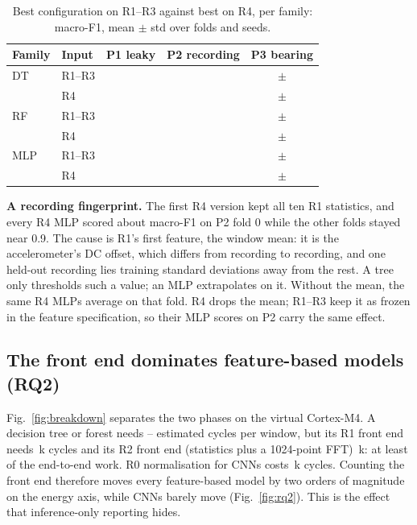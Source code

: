 \begin{table}[t]
\centering
\caption{Best configuration on R1--R3 against best on R4, per family: macro-F1, mean $\pm$ std over folds and
seeds.}
\label{tab:r4}
\setlength{\tabcolsep}{3pt}
\begin{tabular}{llccc}
\toprule
Family & Input & P1 leaky & P2 recording & P3 bearing \\
\midrule
DT  & R1--R3 & \NumPOneDTBaseBest{} & \NumPTwoDTBaseBest{} & \NumPThreeDTBaseBest{}$\pm$\NumPThreeDTBaseBestStd{}\\
    & R4     & \NumPOneDTRFourBest{} & \NumPTwoDTRFourBest{} & \NumPThreeDTRFourBest{}$\pm$\NumPThreeDTRFourBestStd{}\\
RF  & R1--R3 & \NumPOneRFBaseBest{} & \NumPTwoRFBaseBest{} & \NumPThreeRFBaseBest{}$\pm$\NumPThreeRFBaseBestStd{}\\
    & R4     & \NumPOneRFRFourBest{} & \NumPTwoRFRFourBest{} & \NumPThreeRFRFourBest{}$\pm$\NumPThreeRFRFourBestStd{}\\
MLP & R1--R3 & \NumPOneMLPBaseBest{} & \NumPTwoMLPBaseBest{} & \NumPThreeMLPBaseBest{}$\pm$\NumPThreeMLPBaseBestStd{}\\
    & R4     & \NumPOneMLPRFourBest{} & \NumPTwoMLPRFourBest{} & \NumPThreeMLPRFourBest{}$\pm$\NumPThreeMLPRFourBestStd{}\\
\bottomrule
\end{tabular}
\end{table}

\textbf{A recording fingerprint.} The first R4 version kept all ten R1 statistics, and every R4 MLP scored about
\NumAblMeanWith{} macro-F1 on P2 fold 0 while the other folds stayed near 0.9. The cause is R1's first feature, the
window mean: it is the accelerometer's DC offset, which differs from recording to recording, and one held-out
recording lies \NumMeanZMax{} training standard deviations away from the rest. A tree only thresholds such a value;
an MLP extrapolates on it. Without the mean, the same R4 MLPs average \NumAblMeanWithout{} on that fold. R4 drops the
mean; R1--R3 keep it as frozen in the feature specification, so their MLP scores on P2 carry the same effect.

\subsection{The front end dominates feature-based models (RQ2)}
Fig.~\ref{fig:breakdown} separates the two phases on the virtual Cortex-M4. A decision tree or forest needs
\NumTreeInfMin{}--\NumTreeInfMax{} estimated cycles per window, but its R1 front end needs \NumFeROneKcyc{}\,k cycles
and its R2 front end (statistics plus a 1024-point FFT) \NumFeRTwoKcyc{}\,k: at least \NumTreeFeShareMin{} of the
end-to-end work. R0 normalisation for CNNs costs \NumFeRZeroKcyc{}\,k cycles. Counting the front end therefore moves
every feature-based model by two orders of magnitude on the energy axis, while CNNs barely move
(Fig.~\ref{fig:rq2}). This is the effect that inference-only reporting hides.

